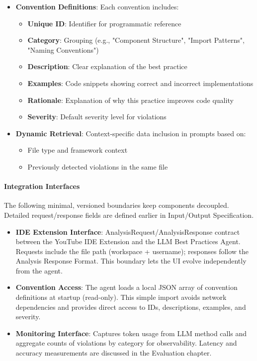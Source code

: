 \begin{spacing}{1.2}
\begin{itemize}
    \item \textbf{Convention Definitions}: Each convention includes:
    \begin{itemize}
        \item \textbf{Unique ID}: Identifier for programmatic reference
        \item \textbf{Category}: Grouping (e.g., "Component Structure", "Import Patterns", "Naming Conventions")
        \item \textbf{Description}: Clear explanation of the best practice
        \item \textbf{Examples}: Code snippets showing correct and incorrect implementations
        \item \textbf{Rationale}: Explanation of why this practice improves code quality
        \item \textbf{Severity}: Default severity level for violations
    \end{itemize}
    \item \textbf{Dynamic Retrieval}: Context-specific data inclusion in prompts based on:
    \begin{itemize}
        \item File type and framework context
        \item Previously detected violations in the same file
    \end{itemize} 
\end{itemize} 

\paragraph{Integration Interfaces}
The following minimal, versioned boundaries keep components decoupled. Detailed request/response fields are defined earlier in Input/Output Specification.

\begin{itemize}
    \item \textbf{IDE Extension Interface}: AnalysisRequest/AnalysisResponse contract between the YouTube IDE Extension and the LLM Best Practices Agent. Requests include the file path (workspace + username); responses follow the Analysis Response Format. This boundary lets the UI evolve independently from the agent.
    \item \textbf{Convention Access}: The agent loads a local JSON array of convention definitions at startup (read-only). This simple import avoids network dependencies and provides direct access to IDs, descriptions, examples, and severity.
    \item \textbf{Monitoring Interface}: Captures token usage from LLM method calls and aggregate counts of violations by category for observability. Latency and accuracy measurements are discussed in the Evaluation chapter.
\end{itemize}



\end{spacing}
